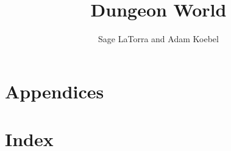 \documentclass[11pt,twoside,twocolumn]{scrbook}
\title{Dungeon World}
\author{Sage LaTorra and Adam Koebel}
\date{}
\begin{document}
\maketitle
\tableofcontents






%


























\chapter{Appendices}
%



\clearpage
\chapter{Index}
\printindex
\end{document}
